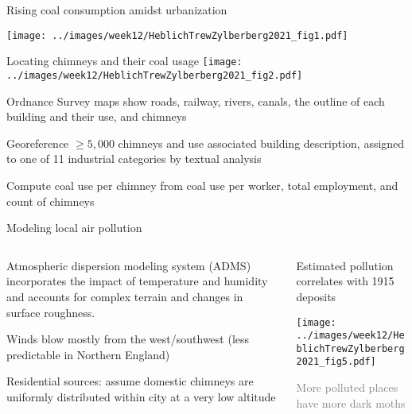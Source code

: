 \documentclass[11pt,notes=hide,aspectratio=169]{beamer}
\begin{document}
\begin{frame}{Rising coal consumption amidst urbanization}
\begin{center}
\texttt{[image: ../images/week12/HeblichTrewZylberberg2021\_fig1.pdf]}
\end{center}
\end{frame}
\begin{frame}{Locating chimneys and their coal usage}
\texttt{[image: ../images/week12/HeblichTrewZylberberg2021\_fig2.pdf]}
\begin{itemize}{\small
\item
Ordnance Survey maps show roads, railway, rivers, canals, the outline of each building and their use, and chimneys
\item 
Georeference $\geq 5,000$ chimneys and use associated building description, assigned to one of 11 industrial categories by textual analysis
\item 
Compute coal use per chimney from coal use per worker, total employment, and count of chimneys\par
}\end{itemize}
\end{frame}
\begin{frame}{Modeling local air pollution}
\begin{columns}[t]
\begin{column}{0.48\textwidth}
\begin{itemize}{\small
\item
Atmospheric dispersion modeling system (ADMS) incorporates the impact of temperature and humidity and accounts for complex terrain and changes in surface roughness.
\item
Winds blow mostly from the west/southwest (less predictable in Northern England)
\item
Residential sources: assume domestic chimneys are uniformly distributed within city at a very low altitude\par
}\end{itemize}
\end{column}
\begin{column}{0.50\textwidth}
{\small Estimated pollution correlates with 1915 deposits\par}
\texttt{[image: ../images/week12/HeblichTrewZylberberg2021\_fig5.pdf]}\\
{\small \textcolor{gray}{More polluted places have more dark moths}\par}
\end{column}
\end{columns}
\end{frame}
\end{document}
